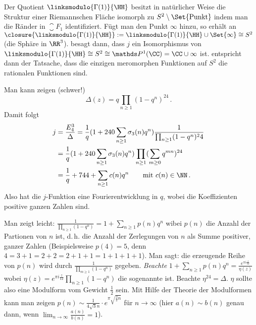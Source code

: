 \begin{beme-list}
	\item Der Quotient $\linksmodulo{\Gamma(1)}{\HH}$ besitzt in natürlicher Weise die Struktur einer Riemannschen Fläche isomorph zu $S^2 \setminus\Set{\text{Punkt}}$ indem man die Ränder in $\closure{F_1}$ identifiziert.
	Fügt man den Punkt $\infty$ hinzu, so erhält an $\closure{\linksmodulo{\Gamma(1)}{\HH}} := \linksmodulo{\Gamma(1)}{\HH} \cup \Set{\infty} \cong S^2$ (die Sphäre in $\RR^3$).
	 besagt dann, dass $j$ ein Isomorphismus von $\linksmodulo{\Gamma(1)}{\HH} \cong S^2 \cong \mathds P^1(\CC) = \CC \cup \infty$ ist.
	 entspricht dann der Tatsache, dass die einzigen meromorphen Funktionen auf $S^2$ die rationalen Funktionen sind.
	
	\item Man kann zeigen (schwer!)
	\[
		\Delta(z) = q \prod_{n\geq1} (1-q^n)^{24}
		\,.
	\]
	Damit folgt
	\begin{align*}
		j
		&= \frac{E_4^3}{\Delta}
		= \frac{1}{q} (1 + 240\sum_{n\geq1} \sigma_3(n)q^n)\frac{1}{\prod_{n\geq1} (1 - q^n)^24} \\
		&= \frac{1}{q} (1 + 240\sum_{n\geq1} \sigma_3(n)q^n) \prod_{n\geq1} (\sum_{m\geq0} q^{mn})^{24} \\
		&= \frac{1}{q} + 744 + \sum_{n \geq 1} c(n)q^n \qquad \text{mit } c(n) \in \NN
		\,.
	\end{align*}
	Also hat die $j$-Funktion eine Fourierentwicklung in $q$, wobei die Koeffizienten positive ganzen Zahlen sind.
	
	\item Man zeigt leicht: $\frac{1}{\prod_{n\geq1} (1-q^n)} = 1 + \sum_{n\geq1} p(n)q^n$ wibei $p(n)$ die Anzahl der Partionen von $n$ ist, d.\,h. die Anzahl der Zerlegungen von $n$ als Summe positiver, ganzer Zahlen (Beispielsweise $p(4) = 5$, denn $4 = 3 + 1 = 2 + 2 = 2 + 1 + 1 = 1 + 1 + 1 + 1$).
	Man sagt: die erzeugende Reihe von $p(n)$ wird durch $\frac{1}{\prod_{m\geq1} (1-q^n)}$ gegeben.
	\emph{Beachte} $1 + \sum_{n\geq1} p(n)q^n = \frac{e^{\pi i\frac{z}{12}}}{\eta(z)}$ wobei $\eta(z) = e^{\pi i\frac{z}{12}} \prod_{n\geq1} (1-q^n)$ die sogenannte  ist.
	Beachte $\eta^24 = \Delta$.
	$\eta$ sollte also eine Modulform vom Gewicht $\frac{1}{2}$ sein.
	Mit Hilfe der Theorie der Modulformen kann man zeigen $p(n) \sim \frac{1}{4\sqrt 3 n} \cdot e^{\pi \sqrt{\frac{3}{2}n}}$ für $n\to\infty$ (hier $a(n) \sim b(n)$ genau dann, wenn $\lim_{n\to\infty} \frac{a(n)}{b(n)} = 1$).
\end{beme-list}